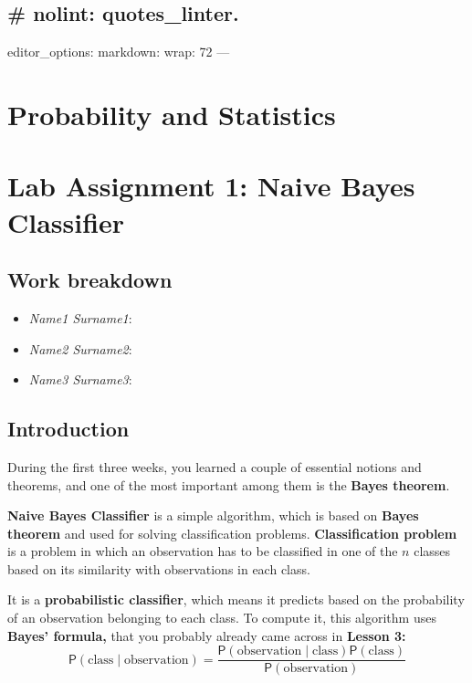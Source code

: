 \documentclass[
]{article}
\author{}
\date{\vspace{-2.5em}}
\providecommand{\tightlist}{%
  \setlength{\itemsep}{0pt}\setlength{\parskip}{0pt}}
\begin{document}
\subsection{\# nolint: quotes\_linter.}\label{nolint-quotes_linter.}

editor\_options: markdown: wrap: 72 ---

\section{Probability and Statistics}\label{probability-and-statistics}

\section{Lab Assignment 1: Naive Bayes
Classifier}\label{lab-assignment-1-naive-bayes-classifier}

\subsection{Work breakdown}\label{work-breakdown}

\begin{itemize}
\tightlist
\item
  \emph{Name1 Surname1}:
\item
  \emph{Name2 Surname2}:
\item
  \emph{Name3 Surname3}:
\end{itemize}

\subsection{Introduction}\label{introduction}

During the first three weeks, you learned a couple of essential notions
and theorems, and one of the most important among them is the
\textbf{Bayes theorem}.

\textbf{Naive Bayes Classifier} is a simple algorithm, which is based on
\textbf{Bayes theorem} and used for solving classification problems.
\textbf{Classification problem} is a problem in which an observation has
to be classified in one of the \(n\) classes based on its similarity
with observations in each class.

It is a \textbf{probabilistic classifier}, which means it predicts based
on the probability of an observation belonging to each class. To compute
it, this algorithm uses \textbf{Bayes' formula,} that you probably
already came across in \textbf{Lesson 3:}
\[\mathsf{P}(\mathrm{class}\mid \mathrm{observation})=\frac{\mathsf{P}(\mathrm{observation}\mid\mathrm{class})\mathsf{P}(\mathrm{class})}{\mathsf{P}(\mathrm{observation})}\]
\end{document}
